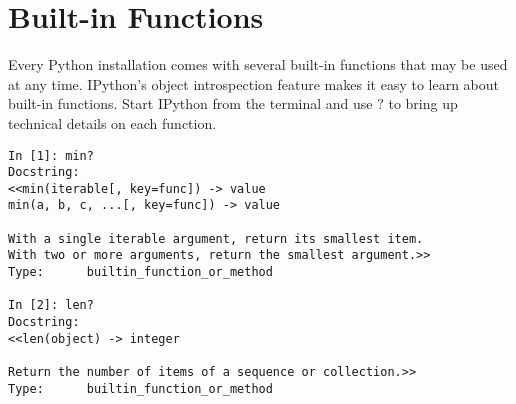 \label{lab:Standard Library}


\section*{Built-in Functions}

Every Python installation comes with several built-in functions that may be used at any time.
IPython's object introspection feature makes it easy to learn about built-in functions.
Start IPython from the terminal and use $?$ to bring up technical details on each function.

\begin{lstlisting}
In [1]: min?
Docstring:
<<min(iterable[, key=func]) -> value
min(a, b, c, ...[, key=func]) -> value

With a single iterable argument, return its smallest item.
With two or more arguments, return the smallest argument.>>
Type:      builtin_function_or_method

In [2]: len?
Docstring:
<<len(object) -> integer

Return the number of items of a sequence or collection.>>
Type:      builtin_function_or_method
\end{lstlisting}

